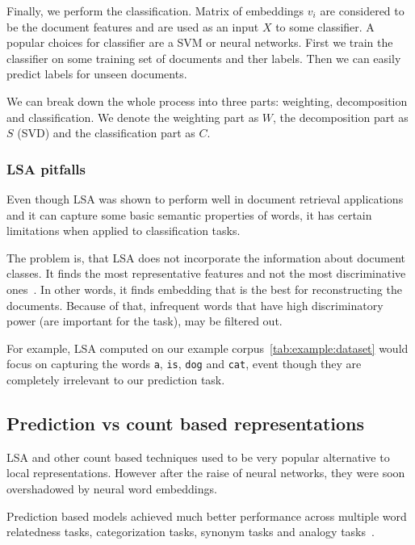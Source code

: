     Finally, we perform the classification.
    Matrix of embeddings $v_i$ are considered to be the document features and are used as an input $X$ to some classifier. 
    A popular choices for classifier are a SVM or neural networks.
    First we train the classifier on some training set of documents and ther labels.
    Then we can easily predict labels for unseen documents.
    
    We can break down the whole process into three parts: weighting, decomposition and classification.
    We denote the weighting part as $W$, the decomposition part as $S$ (SVD) and the classification part as $C$.
    
    \subsubsection{LSA pitfalls}

    Even though LSA was shown to perform well in document retrieval applications and it can capture some basic semantic properties of words,
    it has certain limitations when applied to classification tasks. 
    
    The problem is, that LSA does not incorporate the information about document classes. 
    It finds the most representative features and not the most discriminative ones~\cite{berry1995using}.
    In other words, it finds embedding that is the best for reconstructing the documents.
    Because of that, infrequent words that have high discriminatory power (are important for the task), may be filtered out.
    
    For example, LSA computed on our example corpus~\ref{tab:example:dataset} would focus on capturing the words \texttt{a}, \texttt{is}, \texttt{dog} and \texttt{cat},
    event though they are completely irrelevant to our prediction task.
    
    \subsection{Prediction vs count based representations} \label{sec:count:vs:predict}
        
    LSA and other count based techniques used to be very popular alternative to local representations.
    However after the raise of neural networks, they were soon overshadowed by neural word embeddings.
    
    Prediction based models achieved much better performance across multiple word relatedness tasks, categorization tasks, synonym tasks and analogy tasks~\cite{baroni2014don}. %
    
